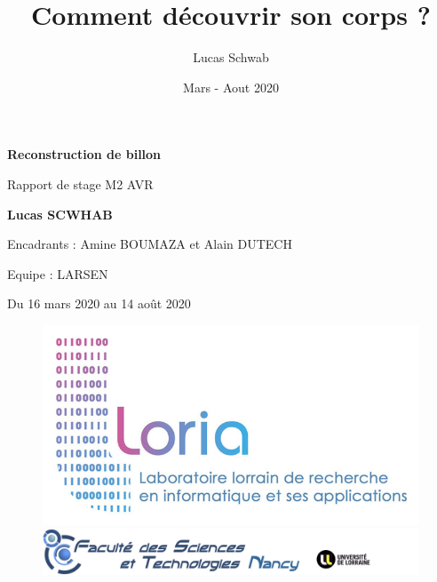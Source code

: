 \documentclass[11pt,french]{report}
\title{Comment découvrir son corps ?}
\author{Lucas Schwab}
\date{Mars - Aout 2020}
\begin{document}

\begin{titlepage}
    \begin{center}
        \vspace*{1cm}
            
        \Huge
        \textbf{Reconstruction de billon}
            
        \vspace{0.5cm}
        \LARGE
        Rapport de stage M2 AVR
        \vspace{1.5cm}
            
        \textbf{Lucas SCWHAB}
            
        \vfill
        
        \vspace{0.8cm}
            
        \Large
        Encadrants : 
        Amine BOUMAZA et Alain DUTECH
        
        Equipe : 
        LARSEN
        
        Du 16 mars 2020 au 14 août 2020
        
        \vspace{0.5cm}
        
        \begin{figure}
            \includegraphics[scale = 0.15]{logo_loria_complet.jpg}
            \includegraphics[scale = 0.32]{logo-fst-haut.png}
        \end{figure}
            
    \end{center}
\end{titlepage}
\end{document}
